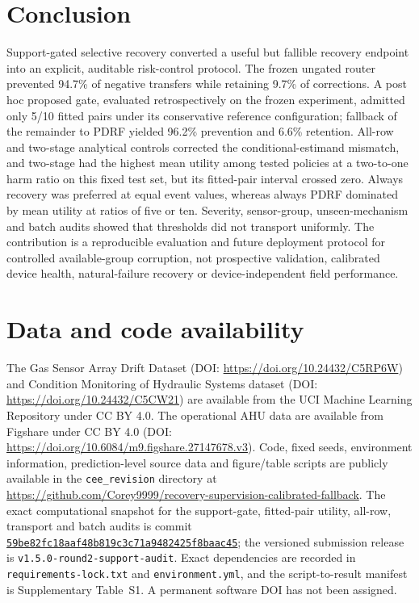 \documentclass[11pt]{article}
\begin{document}
\section{Conclusion}

Support-gated selective recovery converted a useful but fallible recovery endpoint into an explicit, auditable risk-control protocol. The frozen ungated router prevented 94.7\% of negative transfers while retaining 9.7\% of corrections. A post hoc proposed gate, evaluated retrospectively on the frozen experiment, admitted only 5/10 fitted pairs under its conservative reference configuration; fallback of the remainder to PDRF yielded 96.2\% prevention and 6.6\% retention. All-row and two-stage analytical controls corrected the conditional-estimand mismatch, and two-stage had the highest mean utility among tested policies at a two-to-one harm ratio on this fixed test set, but its fitted-pair interval crossed zero. Always recovery was preferred at equal event values, whereas always PDRF dominated by mean utility at ratios of five or ten. Severity, sensor-group, unseen-mechanism and batch audits showed that thresholds did not transport uniformly. The contribution is a reproducible evaluation and future deployment protocol for controlled available-group corruption, not prospective validation, calibrated device health, natural-failure recovery or device-independent field performance.

\section*{Data and code availability}

The Gas Sensor Array Drift Dataset (DOI: \url{https://doi.org/10.24432/C5RP6W}) and Condition Monitoring of Hydraulic Systems dataset (DOI: \url{https://doi.org/10.24432/C5CW21}) are available from the UCI Machine Learning Repository under CC BY 4.0. The operational AHU data are available from Figshare under CC BY 4.0 (DOI: \url{https://doi.org/10.6084/m9.figshare.27147678.v3}). Code, fixed seeds, environment information, prediction-level source data and figure/table scripts are publicly available in the \texttt{cee\_revision} directory at \url{https://github.com/Corey9999/recovery-supervision-calibrated-fallback}. The exact computational snapshot for the support-gate, fitted-pair utility, all-row, transport and batch audits is commit \href{https://github.com/Corey9999/recovery-supervision-calibrated-fallback/tree/59be82fc18aaf48b819c3c71a9482425f8baac45/cee_revision}{\texttt{59be82fc18aaf48b819c3c71a9482425f8baac45}}; the versioned submission release is \texttt{v1.5.0-round2-support-audit}. Exact dependencies are recorded in \texttt{requirements-lock.txt} and \texttt{environment.yml}, and the script-to-result manifest is Supplementary Table~S1. A permanent software DOI has not been assigned.
\end{document}
